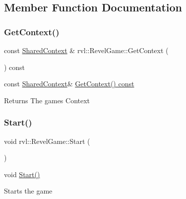 \subsection{Member Function Documentation}
\mbox{\label{classrvl_1_1_revel_game_ab5f7b1a12844e3481d66ab00db1f0104}} 
\subsubsection{\texorpdfstring{Get\+Context()}{GetContext()}}
{\footnotesize\ttfamily const \hyperlink{structrvl_1_1_shared_context}{Shared\+Context} \& rvl\+::\+Revel\+Game\+::\+Get\+Context (\begin{DoxyParamCaption}{ }\end{DoxyParamCaption}) const}



const \hyperlink{structrvl_1_1_shared_context}{Shared\+Context}\& \hyperlink{classrvl_1_1_revel_game_ab5f7b1a12844e3481d66ab00db1f0104}{Get\+Context() const} 

\begin{DoxyReturn}{Returns}
The games Context 
\end{DoxyReturn}
\mbox{\label{classrvl_1_1_revel_game_aaef0b7a8d82a7cc326b39f45c3be0b83}} 
\subsubsection{\texorpdfstring{Start()}{Start()}}
{\footnotesize\ttfamily void rvl\+::\+Revel\+Game\+::\+Start (\begin{DoxyParamCaption}{ }\end{DoxyParamCaption})}



void \hyperlink{classrvl_1_1_revel_game_aaef0b7a8d82a7cc326b39f45c3be0b83}{Start()} 

Starts the game \mbox{\label{classrvl_1_1_revel_game_ae2e535afe54176e266c1ec25ad11f9bc}} 
